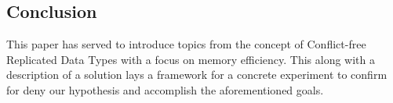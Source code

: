 \documentclass{article}
\begin{document}
\begin{multicols}{2}
\begin{refsection}
\section*{Conclusion}

This paper has served to introduce topics from the concept of Conflict-free Replicated Data Types with a focus on memory efficiency. This along with a description of a solution lays a framework for a concrete experiment to confirm for deny our hypothesis and accomplish the aforementioned goals.

\printbibliography[title=References]
\end{refsection}

\end{multicols}
\end{document}

